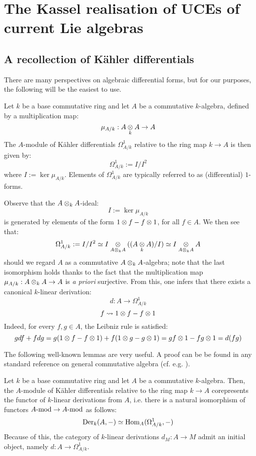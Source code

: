 \section{The Kassel realisation of UCEs of current Lie algebras}
    \subsection{A recollection of K\"ahler differentials}
        There are many perspectives on algebraic differential forms, but for our purposes, the following will be the easiest to use.
        \begin{definition} \label{def: kahler_differentials}
            Let $k$ be a base commutative ring and let $A$ be a commutative $k$-algebra, defined by a multiplication map:
                $$\mu_{A/k}: A \tensor_k A \to A$$
            The $A$-module of K\"ahler differentials $\Omega^1_{A/k}$ relative to the ring map $k \to A$ is then given by:
                $$\Omega^1_{A/k} := I/I^2$$
            where $I := \ker \mu_{A/k}$. Elements of $\Omega^1_{A/k}$ are typically referred to as (differential) $1$-forms.
        \end{definition}
        \begin{remark}
            Observe that the $A \tensor_k A$-ideal:
                $$I := \ker \mu_{A/k}$$
            is generated by elements of the form $1 \tensor f - f \tensor 1$, for all $f \in A$. We then see that:
                $$\Omega^1_{A/k} := I/I^2 \cong I \tensor_{A \tensor_k A} ( (A \tensor_k A)/I ) \cong I \tensor_{A \tensor_k A} A$$
            should we regard $A$ as a commutative $A \tensor_k A$-algebra; note that the last isomorphism holds thanks to the fact that the multiplication map $\mu_{A/k}: A \tensor_k A \to A$ is \textit{a priori} surjective. From this, one infers that there exists a canonical $k$-linear derivation:
                $$d: A \to \Omega^1_{A/k}$$
                $$f \mapsto 1 \tensor f - f \tensor 1$$
            Indeed, for every $f, g \in A$, the Leibniz rule is satisfied:
                $$g df + f dg = g(1 \tensor f - f \tensor 1) + f(1 \tensor g - g \tensor 1) = gf \tensor 1 - fg \tensor 1 = d(fg)$$
        \end{remark}
        The following well-known lemmas are very useful. A proof can be be found in any standard reference on general commutative algebra (cf. e.g. \cite[\href{https://stacks.math.columbia.edu/tag/00AO}{Tag 00AO}]{stacks}).
        \begin{lemma}
            Let $k$ be a base commutative ring and let $A$ be a commutative $k$-algebra. Then, the $A$-module of K\"ahler differentials relative to the ring map $k \to A$ corepresents the functor of $k$-linear derivations from $A$, i.e. there is a natural isomorphism of functors $A\mod \to A\mod$ as follows:
                $$\Der_k(A, -) \cong \Hom_A(\Omega^1_{A/k}, -)$$
            Because of this, the category of $k$-linear derivations $d_M: A \to M$ admit an initial object, namely $d: A \to \Omega^1_{A/k}$. 
        \end{lemma}
